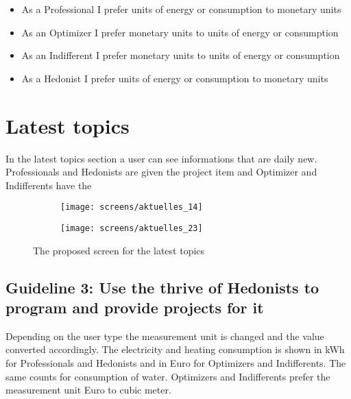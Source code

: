 \begin{itemize}
	\item As a Professional I prefer units of energy or consumption to monetary units
	\item As an Optimizer I prefer monetary units to units of energy or consumption
	\item As an Indifferent I prefer monetary units to units of energy or consumption
	\item As a Hedonist I prefer units of energy or consumption to monetary units
\end{itemize}

\section{Latest topics}

In the latest topics section a user can see informations that are daily new. Professionals and Hedonists are given the project item and Optimizer and Indifferents have the 

\begin{figure}[h]
	\centering
	\begin{subfigure}[b]{0.24\columnwidth}
		\centering
		\texttt{[image: screens/aktuelles\_14]}
		\label{fig:aktuelles:professional}
	\end{subfigure}
	\begin{subfigure}[b]{0.24\columnwidth}
		\centering
		\texttt{[image: screens/aktuelles\_23]}
		\label{fig:aktuelles:optimizer}
	\end{subfigure}
	\caption{The proposed screen for the latest topics}
	\label{fig:aktuelles} %
\end{figure}

\subsection*{Guideline 3: Use the thrive of Hedonists to program and provide projects for it}

Depending on the user type the measurement unit is changed and the value converted accordingly. The electricity and heating consumption is shown in kWh for Professionals and Hedonists and in Euro for Optimizers and Indifferents. The same counts for consumption of water. Optimizers and Indifferents prefer the measurement unit Euro to cubic meter.

